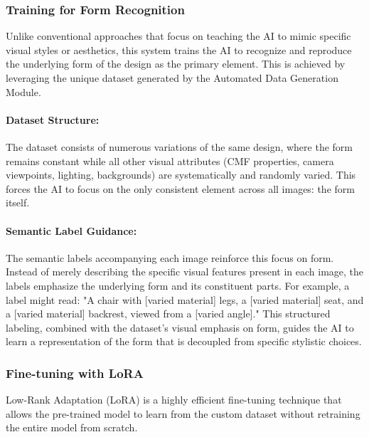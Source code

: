 \documentclass[12pt]{report}
\begin{document}
\subsubsection{Training for Form Recognition}
Unlike conventional approaches that focus on teaching the AI to mimic specific visual styles or aesthetics, this system trains the AI to recognize and reproduce the underlying form of the design as the primary element. This is achieved by leveraging the unique dataset generated by the Automated Data Generation Module.

\paragraph{Dataset Structure:} The dataset consists of numerous variations of the same design, where the form remains constant while all other visual attributes (CMF properties, camera viewpoints, lighting, backgrounds) are systematically and randomly varied. This forces the AI to focus on the only consistent element across all images: the form itself.

\paragraph{Semantic Label Guidance:} The semantic labels accompanying each image reinforce this focus on form. Instead of merely describing the specific visual features present in each image, the labels emphasize the underlying form and its constituent parts. For example, a label might read: "A chair with [varied material] legs, a [varied material] seat, and a [varied material] backrest, viewed from a [varied angle]." This structured labeling, combined with the dataset's visual emphasis on form, guides the AI to learn a representation of the form that is decoupled from specific stylistic choices.

\subsubsection{Fine-tuning with LoRA}
Low-Rank Adaptation (LoRA) is a highly efficient fine-tuning technique that allows the pre-trained model to learn from the custom dataset without retraining the entire model from scratch. 



\figure{}
\end{document}
